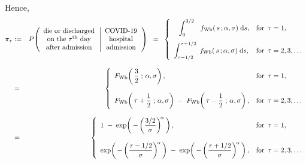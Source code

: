 Hence,
\begin{eqnarray*}
\pi_{\tau}
& := &
	P\!\left(
		\begin{array}{c}
			\textnormal{die or discharged}
			\\
			\textnormal{on the $\tau^{\textnormal{th}}$ day}
			\\
			\textnormal{after admission}
			\end{array}
		\left\vert
		\begin{array}{c}
			\textnormal{COVID-19}
			\\
			\textnormal{hospital}
			\\
			\textnormal{admission}
			\end{array}
			\right.
		\right)
\;\; = \;\;
	\left\{\begin{array}{ll}
		{\color{white}..}\displaystyle\int_{0}^{3/2}\,{\color{white}..}f_{\textnormal{Wb}}(\,s\,;\alpha,\sigma) \;\d s,
		& \textnormal{for \,$\tau = 1$},
		\\
		\overset{{\color{white}1}}{\displaystyle\int_{\tau-1/2}^{\tau+1/2}\; f_{\textnormal{Wb}}(\,s\,;\alpha,\sigma) \;\d s},
		& \textnormal{for \,$\tau = 2,3,\ldots$}
		\end{array}\right.
\\
& = &
	\overset{{\color{white}1}}{\left\{\begin{array}{ll}
		F_{\textnormal{Wb}}\!\left(\,\dfrac{3}{2}\;;\,\alpha,\sigma\right),
		& \textnormal{for \,$\tau = 1$},
		\\ \\
		F_{\textnormal{Wb}}\!\left(\,\tau+\dfrac{1}{2}\;;\,\alpha,\sigma\right)
		\; - \;
		F_{\textnormal{Wb}}\!\left(\,\tau-\dfrac{1}{2}\;;\,\alpha,\sigma\right),
		& \textnormal{for \,$\tau = 2,3,\ldots$}
		\end{array}\right.}
\\
& = &
	\overset{{\color{white}1}}{\left\{\begin{array}{ll}
		1 \; - \; \exp\!\left(\,-\left(\dfrac{3/2}{\sigma}\right)^{\!\alpha}\,\right),
		& \textnormal{for \,$\tau = 1$},
		\\ \\
		\exp\!\left(\,-\left(\dfrac{\tau-1/2}{\sigma}\right)^{\!\alpha}\,\right)
		\; - \;
		\exp\!\left(\,-\left(\dfrac{\tau+1/2}{\sigma}\right)^{\!\alpha}\,\right),
		& \textnormal{for \,$\tau = 2,3,\ldots$}
		\end{array}\right.}
\end{eqnarray*}


